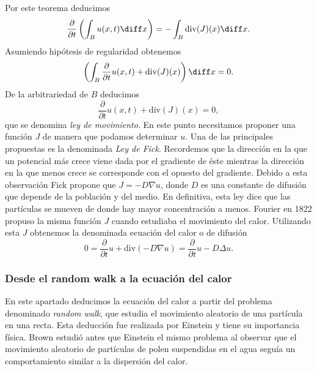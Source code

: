\documentclass{article}
\begin{document}
Por este teorema deducimos
\begin{equation}
  \label{eq:mov:2}
  \frac{\partial}{\partial t} \left( \int_B u(x,t) \diff x\right) = - \int_{B} \mathrm{div}(J)(x) \diff x.
\end{equation}
Asumiendo hipótesis de regularidad obtenemos
\begin{equation}
  \label{eq:mov:3}
  \left( \int_B \frac{\partial}{\partial t} u(x,t) + \mathrm{div}(J)(x) \right) \diff x = 0.
\end{equation}
De la arbitrariedad de $B$ deducimos
\begin{equation}
  \label{eq:mov:4}
  \frac{\partial}{\partial t} u(x,t) + \mathrm{div}(J)(x) = 0,
\end{equation}
que se denomina \emph{ley de movimiento}. En este punto necesitamos proponer una función $J$ de
manera que podamos determinar $u$. Una de las principales propuestas es la denominada \emph{Ley de
  Fick}. Recordemos que la dirección en la que un potencial más crece viene dada por el gradiente de
éste mientras la dirección en la que menos crece se corresponde con el opuesto del gradiente. Debido
a esta observación Fick propone que $J = - D \nabla u$, donde $D$ es una constante de difusión que
depende de la población y del medio. En definitiva, esta ley dice que las partículas se mueven de
donde hay mayor concentración a menos. Fourier en 1822 propuso la misma función $J$ cuando estudiaba
el movimiento del calor. Utilizando esta $J$ obtenemos la denominada ecuación del calor o de
difusión
\begin{equation}
  \label{eq:mov:calor}
  0 = \frac{\partial}{\partial t}u + \mathrm{div}(-D \nabla u) = \frac{\partial}{\partial t}u - D \Delta u.
\end{equation}

\subsubsection{Desde el random walk a la ecuación del calor}

En este apartado deducimos la ecuación del calor a partir del problema denominado \emph{random
  walk}, que estudia el movimiento aleatorio de una partícula en una recta. Esta deducción fue
realizada por Einstein y tiene su importancia física. Brown estudió antes que Einstein el mismo
problema al observar que el movimiento aleatorio de partículas de polen suspendidas en el agua
seguía un comportamiento similar a la dispersión del calor.
\end{document}
